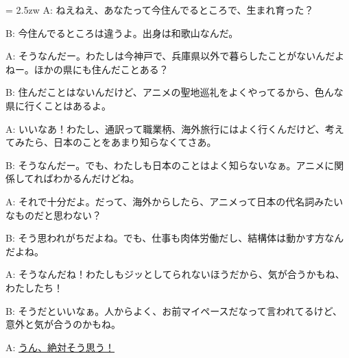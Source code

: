 \documentclass[11pt]{amsart}
\title{}
\author{}
\newenvironment{hangall}[1]{\hangindent = 2.5zw\everypar{\hangindent = 2.5zw}}{}
\begin{document}
\maketitle
\begin{hangall}{}%
A: ねえねえ、あなたって今住んでるところで、生まれ育った？

B: 今住んでるところは違うよ。出身は和歌山なんだ。

A: そうなんだー。わたしは今神戸で、兵庫県以外で暮らしたことがないんだよねー。ほかの県にも住んだことある？

B: 住んだことはないんだけど、アニメの聖地巡礼をよくやってるから、色んな県に行くことはあるよ。

A: いいなあ！わたし、通訳って職業柄、海外旅行にはよく行くんだけど、考えてみたら、日本のことをあまり知らなくてさあ。

B: そうなんだー。でも、わたしも日本のことはよく知らないなぁ。アニメに関係してればわかるんだけどね。

A: それで十分だよ。だって、海外からしたら、アニメって日本の代名詞みたいなものだと思わない？

B: そう思われがちだよね。でも、仕事も肉体労働だし、結構体は動かす方なんだよね。

A: そうなんだね！わたしもジッとしてられないほうだから、気が合うかもね、わたしたち！

B: そうだといいなぁ。人からよく、お前マイペースだなって言われてるけど、意外と気が合うのかもね。

A: \ul{うん、絶対そう思う！}\end{hangall}
\end{document}

